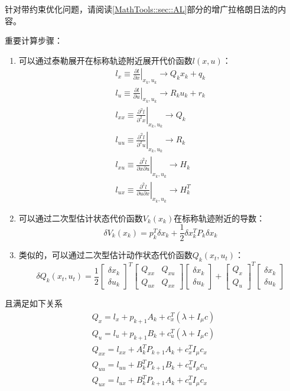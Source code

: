针对带约束优化问题，请阅读\ref{MathTools::sec::AL}部分的增广拉格朗日法的内容。

重要计算步骤：
\begin{enumerate}
	\item 可以通过泰勒展开在标称轨迹附近展开代价函数$l(x,u)$：
		\begin{gather*}
			l_x \equiv \left. \frac{\partial l}{\partial x}\right |_{x_k,u_k} \rightarrow Q_kx_k + q_k \\
			l_u \equiv \left. \frac{\partial l}{\partial u}\right |_{x_k,u_k} \rightarrow R_ku_k + r_k \\
			l_{xx} \equiv \left. \frac{\partial ^2 l}{\partial ^2 x}\right |_{x_k,u_k} \rightarrow Q_k \\
			l_{uu} \equiv \left. \frac{\partial ^2 l}{\partial ^2 u}\right |_{x_k,u_k} \rightarrow R_k \\
			l_{xu} \equiv \left. \frac{\partial ^2 l}{\partial x \partial u}\right |_{x_k,u_k} \rightarrow H_k \\
			l_{ux} \equiv \left. \frac{\partial ^2 l}{\partial u \partial x}\right |_{x_k,u_k} \rightarrow H^T_k
		\end{gather*}
	\item 可以通过二次型估计状态代价函数$V_k(x_k)$在标称轨迹附近的导数：
\begin{equation*}
	\delta V_k(x_k) = p_k^T\delta x_k + \frac{1}{2} \delta x_k^TP_k\delta x_k
\end{equation*}
	\item 类似的，可以通过二次型估计动作状态代价函数$Q_k(x_t,u_t)$：
	\begin{equation*}
		\delta Q_k(x_t,u_t) = \frac{1}{2}
		\begin{bmatrix}
			\delta x_k \\ \delta u_k
		\end{bmatrix}^T
		\begin{bmatrix}
			Q_{xx} & Q_{xu} \\ Q_{ux} & Q_{xx}
		\end{bmatrix}
		\begin{bmatrix}
			\delta x_k \\ \delta u_k
		\end{bmatrix} +
		\begin{bmatrix}
			Q_x \\ Q_u
		\end{bmatrix}^T
		\begin{bmatrix}
			\delta x_k \\ \delta u_k
		\end{bmatrix}
	\end{equation*}
\end{enumerate}
且满足如下关系
\begin{gather*}
	Q_x = l_x + p_{k+1}A_k + c_x^T(\lambda + I_\mu c)\\
	Q_u = l_u + p_{k+1}B_k + c_u^T(\lambda + I_\mu c)\\
	Q_{xx} = l_{xx} + A_k^TP_{k+1}A_k + c_x^TI_\mu c_x\\
	Q_{uu} = l_{uu} + B^T_kP_{k+1}B_k + c_u^TI_\mu c_u\\
	Q_{ux} = l_{ux} + B^T_kP_{k+1}A_k + c_u^TI_\mu c_x
\end{gather*}


